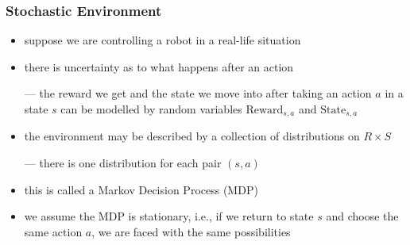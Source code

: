 \begin{frame}\frametitle{Stochastic Environment}
\begin{itemize}

\item suppose we are controlling a robot in a real-life situation

\item there is uncertainty as to what happens after an action

--- the reward we get and the state we move into after taking an
    action $a$ in a state $s$ can be modelled by random variables
    $\text{Reward}_{s,a}$ and $\text{State}_{s,a}$

\item the environment may be described by a collection of
    distributions on $R\times S$

--- there is one distribution for each pair $(s,a)$

\item this is called a \alert{Markov Decision Process (MDP)}

\item we assume the MDP is stationary, i.e., if we return to state $s$
and choose the same action $a$, we are faced with the same possibilities

\end{itemize}
\end{frame}












